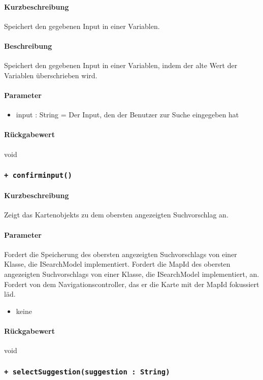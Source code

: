 \paragraph*{Kurzbeschreibung}
Speichert den gegebenen Input in einer Variablen.
\paragraph*{Beschreibung}
Speichert den gegebenen Input in einer Variablen, indem der alte Wert der Variablen überschrieben wird.
\paragraph*{Parameter}
\begin{itemize}
    \item input : String = Der Input, den der Benutzer zur Suche eingegeben hat
\end{itemize}
\paragraph*{Rückgabewert}
void

\subsubsection{\texttt{+ confirminput()}}%
\paragraph*{Kurzbeschreibung}
Zeigt das Kartenobjekts zu dem obersten angezeigten Suchvorschlag an.
\paragraph*{Parameter}
Fordert die Speicherung des obersten angezeigten Suchvorschlags von einer Klasse, die ISearchModel implementiert.
Fordert die MapId des obersten angezeigten Suchvorschlags von einer Klasse, die ISearchModel implementiert, an.
Fordert von dem Navigationscontroller, das er die Karte mit der MapId fokussiert läd.
\begin{itemize}
    \item keine
\end{itemize}
\paragraph*{Rückgabewert}
void

\subsubsection{\texttt{+ selectSuggestion(suggestion : String)}}%
